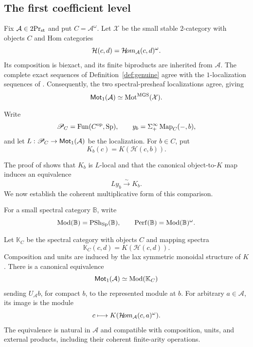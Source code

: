 \subsection{The first coefficient level}

Fix $\mathcal A\in{2}\mathrm{Pr}_{\mathrm{st}}$ and put $C=\mathcal A^\omega$.
Let $\mathcal X$ be the small stable $2$-category
with objects $C$ and Hom categories
\[
 \mathcal H(c,d)=\mathcal{H}\!om_{\mathcal A}(c,d)^\omega.
\]
Its composition is biexact, and its finite
biproducts are inherited from $\mathcal A$.
The complete exact sequences of
Definition~\ref{def:genuine} agree with the
$1$-localization sequences of
\citep[Definition~1.2.2]{MGS}.
Consequently, the two spectral-presheaf
localizations agree, giving
\[
 \mathsf{Mot}_1(\mathcal A)
 \simeq\operatorname{Mot}^{\mathrm{MGS}}(\mathcal X).
\]

Write
\[
 \mathscr P_C=\operatorname{Fun}(C^{\mathrm{op}},\mathrm{Sp}),
 \qquad
 y_b=\Sigma^\infty_+\operatorname{Map}_C(-,b),
\]
and let
$L:\mathscr P_C\to\mathsf{Mot}_1(\mathcal A)$
be the localization.
For $b\in C$, put
\[
 K_b(c)=K(\mathcal H(c,b)).
\]

The proof of \citep[Theorem~2.3.1]{MGS}
shows that $K_b$ is $L$-local and that the
canonical object-to-$K$ map induces an
equivalence
\begin{equation}\label{eq:height-one-unit}
 Ly_b\xrightarrow{\sim}K_b.
\end{equation}
We now establish the coherent multiplicative
form of this comparison.

For a small spectral category $\mathbb B$, write
\[
 \operatorname{Mod}(\mathbb B)=\operatorname{PSh}_{\mathrm{Sp}}(\mathbb B),
 \qquad
 \operatorname{Perf}(\mathbb B)=\operatorname{Mod}(\mathbb B)^\omega.
\]

\begin{proposition}\label{prop:height-one-presentation}
Let $\mathbb K_C$ be the spectral category
with objects $C$ and mapping spectra
\[
 \mathbb K_C(c,d)=K(\mathcal H(c,d)).
\]
Composition and units are induced by the
lax symmetric monoidal structure of $K$
\citep{BGTMult}.
There is a canonical equivalence
\begin{equation}\label{eq:height-one-presentation}
 \mathsf{Mot}_1(\mathcal A)\simeq\operatorname{Mod}(\mathbb K_C)
\end{equation}
sending $U_{\mathcal A}b$, for compact $b$,
to the represented module at $b$.
For arbitrary $a\in\mathcal A$, its image
is the module
\[
 c\longmapsto
 K(\mathcal{H}\!om_{\mathcal A}(c,a)^\omega).
\]
The equivalence is natural in $\mathcal A$
and compatible with composition, units,
and external products, including their
coherent finite-arity operations.
\end{proposition}


